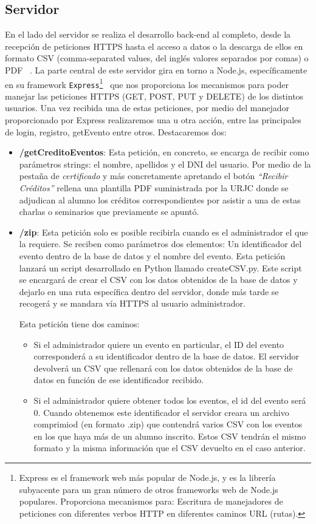 \documentclass[a4paper, 12pt]{book}
\begin{document}
\subsection{Servidor}
	En el lado del servidor se realiza el desarrollo back-end al completo, desde la recepción de peticiones HTTPS hasta el acceso a datos o la descarga de ellos en formato CSV (comma-separated values, del inglés valores separados por comas) o PDF ~\cite{csvreader}.
	La parte central de este servidor gira en torno a Node.js, específicamente en su framework \texttt{Express}\footnote{Express es el framework web más popular de Node.js, y es la librería subyacente para un gran número de otros frameworks web de Node.js populares. Proporciona mecanismos para: Escritura de manejadores de peticiones con diferentes verbos HTTP en diferentes caminos URL (rutas).}~\cite{angular}  que nos proporciona los mecanismos para poder manejar las peticiones HTTPS (GET, POST, PUT y DELETE) de los distintos usuarios. Una vez recibida una de estas peticiones, por medio del manejador proporcionado por Express realizaremos una u otra acción, entre las principales de login, registro, getEvento entre otros. Destacaremos dos:
	
\begin{itemize}
	\item \textbf{/getCreditoEventos}: Esta petición, en concreto, se encarga de recibir como parámetros strings: el nombre, apellidos y el DNI del usuario. Por medio de la pestaña de \textit{certificado} y más concretamente apretando el botón \textit{``Recibir Créditos''} rellena una plantilla PDF suministrada por la URJC donde se adjudican al alumno los créditos correspondientes por asistir a una de estas charlas o seminarios que previamente se apuntó.
	

	\item \textbf{/zip}: Esta petición solo es posible recibirla cuando es el administrador el que la requiere. Se reciben como parámetros dos elementos: Un identificador del evento dentro de la base de datos y el nombre del evento. Esta petición lanzará un script desarrollado en Python llamado createCSV.py. Este script se encargará de crear el CSV con los datos obtenidos de la base de datos y dejarlo en una ruta específica dentro del servidor, donde más tarde se recogerá y se mandara vía HTTPS al usuario administrador.

Esta petición tiene dos caminos:
\begin{itemize}
	\item  Si el administrador quiere un evento en particular, el ID del evento corresponderá a su identificador dentro de la base de datos. El servidor devolverá un CSV que rellenará con los datos obtenidos de la base de datos en función de ese identificador recibido. 
	\item Si el administrador quiere obtener todos los eventos, el id del evento será 0. Cuando obtenemos este identificador el servidor creara un archivo comprimiod (en formato .zip) que contendrá varios CSV con los eventos en los que haya más de un alumno inscrito. Estos CSV tendrán el mismo formato y la misma información que el CSV devuelto en el caso anterior.
\end{itemize}
\end{itemize}
\end{document}
